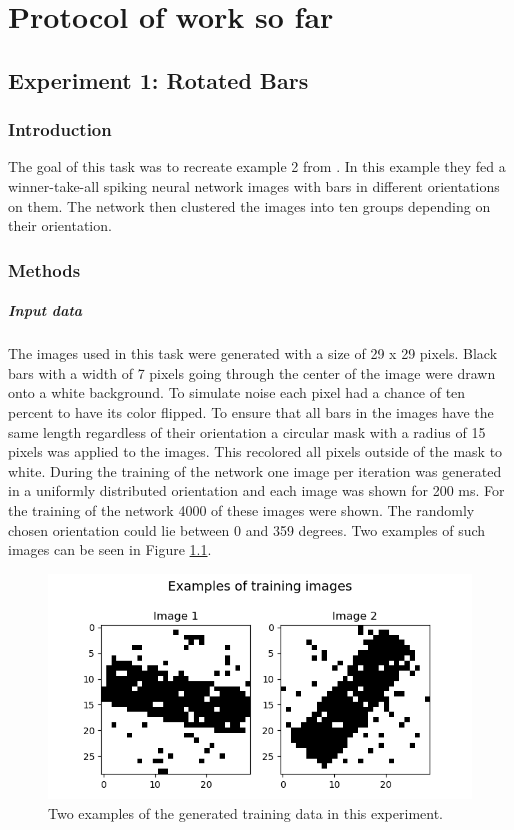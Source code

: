 \chapter{Protocol of work so far}
\section{Experiment 1: Rotated Bars}
\label{section:rotatedLines}
\subsection{Introduction}
The goal of this task was to recreate example 2 from \citet{nessler}. In this example they fed a winner-take-all spiking neural network images with bars in different orientations on them. The network then clustered the images into ten groups depending on their orientation.

\subsection{Methods}
\paragraph{Input data}
The images used in this task were generated with a size of 29 x 29 pixels. Black bars with a width of 7 pixels going through the center of the image were drawn onto a white background. To simulate noise each pixel had a chance of ten percent to have its color flipped. To ensure that all bars in the images have the same length regardless of their orientation a circular mask with a radius of 15 pixels was applied to the images. This recolored all pixels outside of the mask to white. During the training of the network one image per iteration was generated in a uniformly distributed orientation and each image was shown for 200 ms. For the training of the network 4000 of these images were shown. The randomly chosen orientation could lie between 0 and 359 degrees.  Two examples of such images can be seen in Figure \ref{fig:angleImages}.

\begin{figure}
  \includegraphics[width=\linewidth]{figures/angleNetwork/trainingImages.png}
  \caption{Two examples of the generated training data in this experiment.}
  \label{fig:angleImages}
\end{figure}

